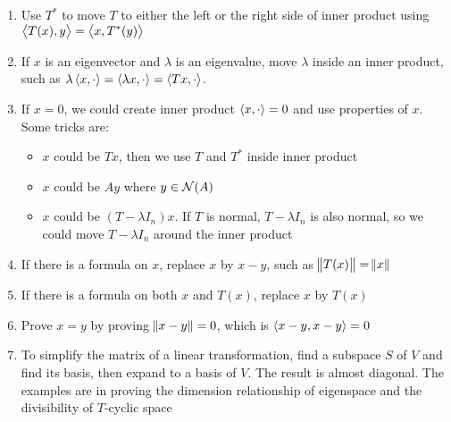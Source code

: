 \begin{enumerate}
    \item Use $T^*$ to move $T$ to either the left or the right side of inner product using $\left\langle \displaystyle T(x), y \right\rangle = \left\langle \displaystyle x, T^* (y) \right\rangle$
    \item If $x$ is an eigenvector and $\lambda$ is an eigenvalue, move $\lambda$ inside an inner product, such as $\lambda \left\langle \displaystyle x, \cdot \right\rangle = \left\langle \displaystyle \lambda x, \cdot \right\rangle = \left\langle \displaystyle Tx, \cdot \right\rangle$.
    \item If $x=0$, we could create inner product $\left\langle \displaystyle x, \cdot \right\rangle = 0$ and use properties of $x$. Some tricks are:
        \begin{itemize}
            \item $x$ could be $Tx$, then we use $T$ and $T^*$ inside inner product
            \item $x$ could be $Ay$ where $y \in \mathcal{N}(A)$
            \item $x$ could be $(T - \lambda I_n)x$. If $T$ is normal, $T-\lambda I_n$ is also normal, so we could move $T-\lambda I_n$ around the inner product
        \end{itemize}
    \item If there is a formula on $x$, replace $x$ by $x-y$, such as $\norm{T(x)} = \norm{x}$
    \item If there is a formula on both $x$ and $T(x)$, replace $x$ by $T(x)$
    \item Prove $x = y$ by proving $\norm{x - y} = 0$, which is $\left\langle \displaystyle x - y, x - y \right\rangle = 0$
    \item To simplify the matrix of a linear transformation, find a subspace $S$ of $V$ and find its basis, then expand to a basis of $V$. The result is almost diagonal. The examples are in proving the dimension relationship of eigenspace and the divisibility of $T$-cyclic space
\end{enumerate}

